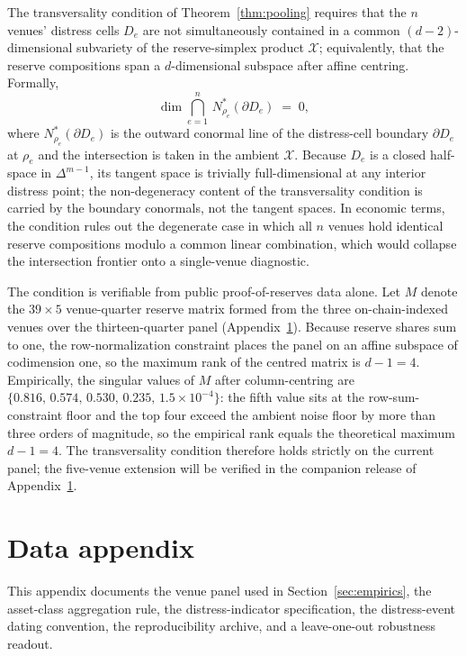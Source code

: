 \documentclass[12pt]{article}
\theoremstyle{sampledef}
\theoremstyle{sampleplain}
\theoremstyle{sampleremark}
\newcommand{\1}{\mathbf{1}}
\begin{document}
The transversality condition of Theorem~\ref{thm:pooling} requires
that the $n$ venues' distress cells $D_e$ are not simultaneously
contained in a common $(d-2)$-dimensional subvariety of the
reserve-simplex product $\mathcal{X}$; equivalently, that the
reserve compositions span a $d$-dimensional subspace after affine
centring. Formally,
\[
\dim \bigcap_{e=1}^{n}\, N^{*}_{\rho_e} (\partial D_e) \;=\; 0,
\]
where $N^{*}_{\rho_e}(\partial D_e)$ is the outward conormal line
of the distress-cell boundary $\partial D_e$ at $\rho_e$
and the intersection is taken in the ambient $\mathcal{X}$. Because
$D_e$ is a closed half-space in $\Delta^{m-1}$, its tangent space
is trivially full-dimensional at any interior distress point; the
non-degeneracy content of the transversality condition is carried
by the boundary conormals, not the tangent spaces. In
economic terms, the condition rules out the degenerate case in
which all $n$ venues hold identical reserve compositions modulo a
common linear combination, which would collapse the intersection
frontier onto a single-venue diagnostic.

The condition is verifiable from public proof-of-reserves data
alone. Let $M$ denote the $39 \times 5$ venue-quarter reserve
matrix formed from the three on-chain-indexed venues over the
thirteen-quarter panel (Appendix~\ref{app:data}). Because reserve
shares sum to one, the row-normalization constraint places the
panel on an affine subspace of codimension one, so the maximum
rank of the centred matrix is $d - 1 = 4$. Empirically, the
singular values of $M$ after column-centring are
$\{0.816,\,0.574,\,0.530,\,0.235,\,1.5\times 10^{-4}\}$: the fifth
value sits at the row-sum-constraint floor and the top four
exceed the ambient noise floor by more than three orders of
magnitude, so the empirical rank equals the theoretical maximum
$d - 1 = 4$. The transversality condition therefore holds
strictly on the current panel; the five-venue extension will be
verified in the companion release of Appendix~\ref{app:data}.

\section{Data appendix}\label{app:data}

This appendix documents the venue panel used in
Section~\ref{sec:empirics}, the asset-class aggregation rule, the
distress-indicator specification, the distress-event dating
convention, the reproducibility archive, and a leave-one-out
robustness readout.
\end{document}
